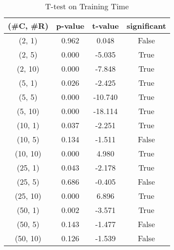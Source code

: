 \begin{table}[h]
\centering
\caption{T-test on Training Time}
\label{tab:t-testTraining}
\begin{tabular}{|c|c|c|c|}
\toprule
(\#C, \#R) &  p-value &  t-value &  significant \\
\midrule
  (2, 1) &    0.962 &    0.048 &        False \\
  (2, 5) &    0.000 &   -5.035 &         True \\
 (2, 10) &    0.000 &   -7.848 &         True \\
  (5, 1) &    0.026 &   -2.425 &         True \\
  (5, 5) &    0.000 &  -10.740 &         True \\
 (5, 10) &    0.000 &  -18.114 &         True \\
 (10, 1) &    0.037 &   -2.251 &         True \\
 (10, 5) &    0.134 &   -1.511 &        False \\
(10, 10) &    0.000 &    4.980 &         True \\
 (25, 1) &    0.043 &   -2.178 &         True \\
 (25, 5) &    0.686 &   -0.405 &        False \\
(25, 10) &    0.000 &    6.896 &         True \\
 (50, 1) &    0.002 &   -3.571 &         True \\
 (50, 5) &    0.143 &   -1.477 &        False \\
(50, 10) &    0.126 &   -1.539 &        False \\
\bottomrule
\end{tabular}
\end{table}
